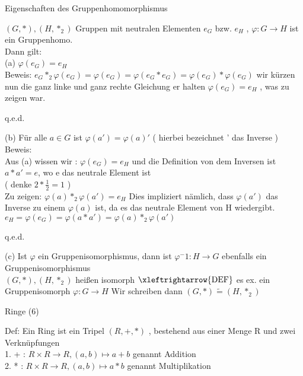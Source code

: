 \documentclass[headsepline,12pt,a4paper]{scrartcl}
\begin{document}
\begin{center}
\item[Eigenschaften des Gruppenhomomorphismus]
\end{center}
\item $(G,*), (H, *_2) $ Gruppen mit neutralen Elementen $e_G$ bzw. $e_H$ , $ \varphi: G \rightarrow H $ ist ein Gruppenhomo. \\
Dann gilt: \\
(a) $\varphi(e_G)=e_H$ \\
Beweis: $ e_G *_2 \varphi(e_G) = \varphi(e_G) = \varphi(e_G * e_G) = \varphi(e_G) * \varphi(e_G) $ wir kürzen nun die ganz linke und ganz rechte Gleichung er halten $\varphi(e_G)=e_H$ , was zu zeigen war. 
\begin{flushright}
q.e.d.
\end{flushright}
(b) Für alle $ a \in G $ ist $ \varphi(a') = \varphi (a)' $ ( hierbei bezeichnet ' das Inverse )\\
Beweis: \\

Aus (a) wissen wir : $\varphi(e_G)=e_H$ und die Definition von dem Inversen ist $ a * a' = e $, wo e das neutrale Element ist \\
( denke $ 2 * \frac{1}{2} = 1 $ ) \\
Zu zeigen: $\varphi(a) *_2 \varphi(a') = e_H $ Dies impliziert nämlich, dass $\varphi(a')$ das Inverse zu einem $\varphi(a)$ ist, da es das neutrale Element von H wiedergibt. \\
$e_H=\varphi(e_G) = \varphi(a*a') = \varphi(a) *_2 \varphi(a') $ 
\begin{flushright}
q.e.d. \\
\end{flushright}

(c) Ist $\varphi$ ein Gruppenisomorphismus, dann ist $\varphi ^-1 : H \rightarrow G $ ebenfalls ein Gruppenisomorphismus \\
$(G,*), (H, *_2) $ heißen isomorph $ \xleftrightarrow{\text{DEF}} $ es ex. ein Gruppenisomorph
 $ \varphi : G \rightarrow H $ Wir schreiben dann $(G,*) \tilde{=} (H,*_2) $

\begin{center}
\item[Ringe (6) ]
\end{center}
\item Def: Ein Ring ist ein Tripel $(R,+,*)$ , bestehend aus einer Menge R und zwei Verknüpfungen \\
1. + : $ R \times R \rightarrow R , (a,b) \mapsto a+b $ genannt Addition \\
2. * : $ R \times R \rightarrow R , (a,b) \mapsto a*b $ genannt Multiplikation \\
\end{document}
